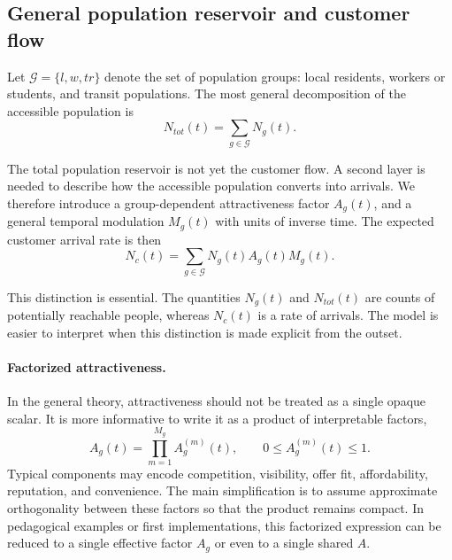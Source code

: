 \documentclass{article}
\begin{document}
\subsection{General population reservoir and customer flow}
\label{sec:population-general}

Let \( \mathcal{G} = \{l,w,tr\} \) denote the set of population groups: local residents, workers or students, and transit populations. The most general decomposition of the accessible population is
\begin{equation}
\label{eq:Ntot-general}
    N_{tot}(t) = \sum_{g \in \mathcal{G}} N_g(t).
\end{equation}

The total population reservoir is not yet the customer flow. A second layer is needed to describe how the accessible population converts into arrivals. We therefore introduce a group-dependent attractiveness factor \( A_g(t) \), and a general temporal modulation \( M_g(t) \) with units of inverse time. The expected customer arrival rate is then
\begin{equation}
\label{eq:Nc-general}
    N_c(t) = \sum_{g \in \mathcal{G}} N_g(t) A_g(t) M_g(t).
\end{equation}

This distinction is essential. The quantities \( N_g(t) \) and \( N_{tot}(t) \) are counts of potentially reachable people, whereas \( N_c(t) \) is a rate of arrivals. The model is easier to interpret when this distinction is made explicit from the outset.

\paragraph{Factorized attractiveness.}
In the general theory, attractiveness should not be treated as a single opaque scalar. It is more informative to write it as a product of interpretable factors,
\begin{equation}
\label{eq:A-factorized}
    A_g(t) = \prod_{m=1}^{M_g} A_g^{(m)}(t), \qquad 0 \leq A_g^{(m)}(t) \leq 1.
\end{equation}
Typical components may encode competition, visibility, offer fit, affordability, reputation, and convenience. The main simplification is to assume approximate orthogonality between these factors so that the product remains compact. In pedagogical examples or first implementations, this factorized expression can be reduced to a single effective factor \( A_g \) or even to a single shared \( A \).
\end{document}
